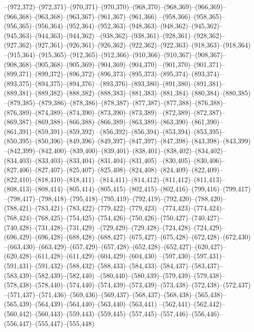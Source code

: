 --(972,372)--(972,371)--(970,371)--(970,370)--(968,370)--(968,369)--(966,369)--(966,368)--(963,368)--(963,367)--(961,367)--(961,366)
--(958,366)--(958,365)--(956,365)--(956,364)--(952,364)--(952,363)--(948,363)--(948,362)--(945,362)--(945,363)--(944,363)--(944,362)
--(938,362)--(938,361)--(928,361)--(928,362)--(927,362)--(927,361)--(926,361)--(926,362)--(922,362)--(922,363)--(918,363)--(918,364)
--(915,364)--(915,365)--(912,365)--(912,366)--(910,366)--(910,367)--(908,367)--(908,368)--(905,368)--(905,369)--(904,369)--(904,370)
--(901,370)--(901,371)--(899,371)--(899,372)--(896,372)--(896,373)--(895,373)--(895,374)--(893,374)--(893,375)--(894,375)--(894,376)
--(893,376)--(893,380)--(891,380)--(891,381)--(889,381)--(889,382)--(888,382)--(888,383)--(881,383)--(881,384)--(880,384)--(880,385)
--(879,385)--(879,386)--(878,386)--(878,387)--(877,387)--(877,388)--(876,388)--(876,389)--(874,389)--(874,390)--(873,390)--(873,389)
--(872,389)--(872,387)--(869,387)--(869,388)--(866,388)--(866,389)--(863,389)--(863,390)--(861,390)--(861,391)--(859,391)--(859,392)
--(856,392)--(856,394)--(853,394)--(853,395)--(850,395)--(850,396)--(849,396)--(849,397)--(847,397)--(847,398)--(843,398)--(843,399)
--(842,399)--(842,400)--(839,400)--(839,401)--(838,401)--(838,402)--(834,402)--(834,403)--(833,403)--(833,404)--(831,404)--(831,405)
--(830,405)--(830,406)--(827,406)--(827,407)--(825,407)--(825,408)--(824,408)--(824,409)--(822,409)--(822,410)--(818,410)--(818,411)
--(814,411)--(814,412)--(811,412)--(811,413)--(808,413)--(808,414)--(805,414)--(805,415)--(802,415)--(802,416)--(799,416)--(799,417)
--(798,417)--(798,418)--(795,418)--(795,419)--(792,419)--(792,420)--(788,420)--(788,421)--(783,421)--(783,422)--(779,422)--(779,423)
--(774,423)--(774,424)--(768,424)--(768,425)--(754,425)--(754,426)--(750,426)--(750,427)--(740,427)--(740,428)--(731,428)--(731,429)
--(729,429)--(729,428)--(724,428)--(724,429)--(696,429)--(696,428)--(688,428)--(688,427)--(675,427)--(675,428)--(672,428)--(672,430)
--(663,430)--(663,429)--(657,429)--(657,428)--(652,428)--(652,427)--(620,427)--(620,428)--(611,428)--(611,429)--(604,429)--(604,430)
--(597,430)--(597,431)--(591,431)--(591,432)--(588,432)--(588,433)--(584,433)--(584,437)--(583,437)--(583,439)--(582,439)--(582,440)
--(580,440)--(580,439)--(579,439)--(579,438)--(578,438)--(578,440)--(574,440)--(574,439)--(573,439)--(573,438)--(572,438)--(572,437)
--(571,437)--(571,436)--(569,436)--(569,437)--(568,437)--(568,438)--(565,438)--(565,439)--(564,439)--(564,440)--(563,440)--(563,441)
--(562,441)--(562,442)--(560,442)--(560,443)--(559,443)--(559,445)--(557,445)--(557,446)--(556,446)--(556,447)--(555,447)--(555,448)
